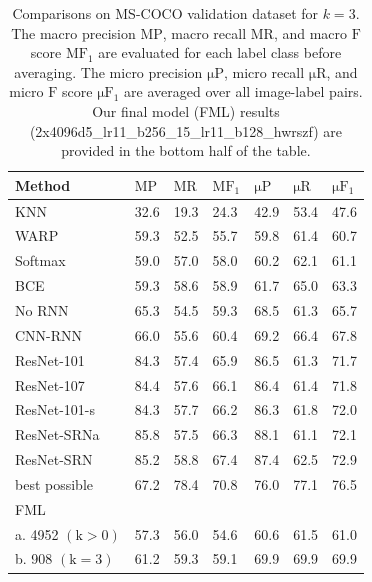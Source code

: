 \documentclass[12pt,journal,compsoc]{IEEEtran}
\begin{document}
\begin{table}
\caption{Comparisons on MS-COCO validation dataset for $k=3$. The macro precision $\mathrm{MP}$, macro recall $\mathrm{MR}$, and macro $\mathrm{F}$ score $\mathrm{MF_1}$ are evaluated for each label class before averaging.  The micro precision $\mathrm{\mu P}$, micro recall $\mathrm{\mu R}$, and micro $\mathrm{F}$ score $\mathrm{\mu F_1}$ are averaged over all image-label pairs. Our final model (FML) results (2x4096d5\_lr11\_b256\_15\_lr11\_b128\_hwrszf) are provided in the bottom half of the table.}
\label{tab:PRF1}
\centering
\begin{tabular}{lllllll}
\toprule
Method & $\mathrm{MP}$ & $\mathrm{MR}$ & $\mathrm{MF_1}$ & $\mathrm{\mu P}$ & $\mathrm{\mu R}$ & $\mathrm{\mu F_1}$ \\
\midrule
KNN~\cite{nus-wide-civr09}    & 32.6 & 19.3 & 24.3 & 42.9 & 53.4 & 47.6 \\
WARP~\cite{GongJLTI13}        & 59.3 & 52.5 & 55.7 & 59.8 & 61.4 & 60.7 \\
Softmax~\cite{WangYMHHX16}    & 59.0 & 57.0 & 58.0 & 60.2 & 62.1 & 61.1 \\
BCE~\cite{WangYMHHX16}        & 59.3 & 58.6 & 58.9 & 61.7 & 65.0 & 63.3 \\
No RNN~\cite{WangYMHHX16}     & 65.3 & 54.5 & 59.3 & 68.5 & 61.3 & 65.7 \\
CNN-RNN~\cite{WangYMHHX16}    & 66.0 & 55.6 & 60.4 & 69.2 & 66.4 & 67.8 \\
ResNet-101~\cite{HeZRS15}     & 84.3 & 57.4 & 65.9 & 86.5 & 61.3 & 71.7 \\
ResNet-107~\cite{ZhuLOYW17}   & 84.4 & 57.6 & 66.1 & 86.4 & 61.4 & 71.8 \\
ResNet-101-s~\cite{ZhuLOYW17} & 84.3 & 57.7 & 66.2 & 86.3 & 61.8 & 72.0 \\
ResNet-SRNa~\cite{ZhuLOYW17} & 85.8 & 57.5 & 66.3 & 88.1 & 61.1 & 72.1 \\
ResNet-SRN~\cite{ZhuLOYW17}   & 85.2 & 58.8 & 67.4 & 87.4 & 62.5 & 72.9 \\
\midrule
best possible                 & 67.2 & 78.4 & 70.8 & 76.0 & 77.1 & 76.5 \\
\midrule %
FML  & & & & & & \\
a. 4952 $\mathrm{(k > 0)}$       & 57.3 & 56.0 & 54.6 & 60.6 & 61.5 & 61.0 \\
b. 908 $\mathrm{(k = 3)}$       & 61.2 & 59.3 & 59.1 & 69.9 & 69.9 & 69.9 \\

\end{tabular}
\end{table}
\end{document}
